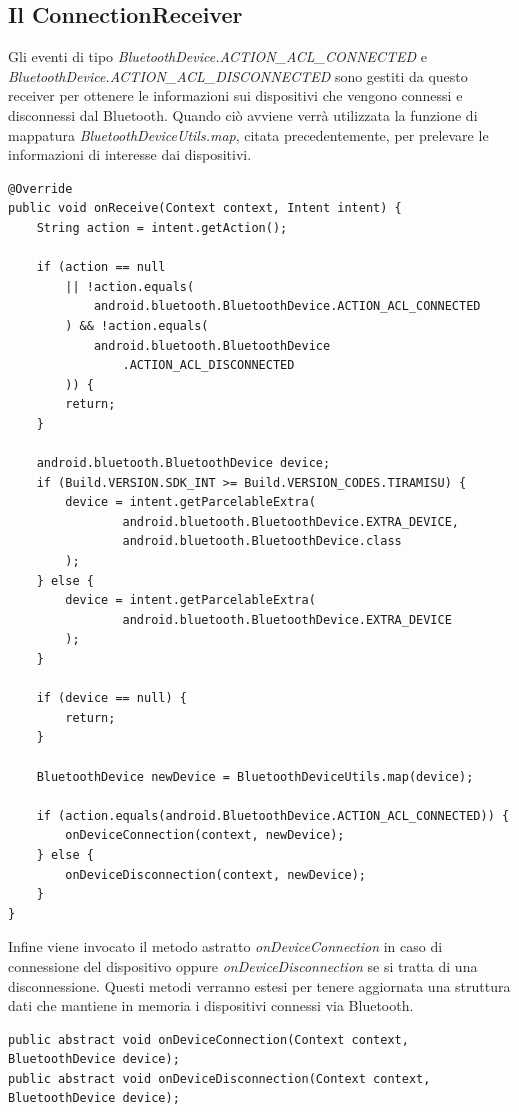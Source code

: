 \subsection{Il ConnectionReceiver}
Gli eventi di tipo \textit{BluetoothDevice.ACTION\_ACL\_CONNECTED} e \textit{BluetoothDevice.ACTION\_ACL\_DISCONNECTED} sono gestiti da questo receiver per ottenere le informazioni sui dispositivi che vengono connessi e disconnessi dal Bluetooth. Quando ciò avviene verrà utilizzata la funzione di mappatura \textit{BluetoothDeviceUtils.map}, citata precedentemente, per prelevare le informazioni di interesse dai dispositivi.
\begin{verbatim}
@Override
public void onReceive(Context context, Intent intent) {
    String action = intent.getAction();

    if (action == null 
        || !action.equals(
            android.bluetooth.BluetoothDevice.ACTION_ACL_CONNECTED
        ) && !action.equals(
            android.bluetooth.BluetoothDevice
                .ACTION_ACL_DISCONNECTED
        )) {
        return;
    }

    android.bluetooth.BluetoothDevice device;
    if (Build.VERSION.SDK_INT >= Build.VERSION_CODES.TIRAMISU) {
        device = intent.getParcelableExtra(
                android.bluetooth.BluetoothDevice.EXTRA_DEVICE,
                android.bluetooth.BluetoothDevice.class
        );
    } else {
        device = intent.getParcelableExtra(
                android.bluetooth.BluetoothDevice.EXTRA_DEVICE
        );
    }

    if (device == null) {
        return;
    }

    BluetoothDevice newDevice = BluetoothDeviceUtils.map(device);

    if (action.equals(android.BluetoothDevice.ACTION_ACL_CONNECTED)) {
        onDeviceConnection(context, newDevice);
    } else {
        onDeviceDisconnection(context, newDevice);
    }
}
\end{verbatim}

Infine viene invocato il metodo astratto \textit{onDeviceConnection} in caso di connessione del dispositivo oppure \textit{onDeviceDisconnection} se si tratta di una disconnessione. Questi metodi verranno estesi per tenere aggiornata una struttura dati che mantiene in memoria i dispositivi connessi via Bluetooth.
\begin{verbatim}
public abstract void onDeviceConnection(Context context, BluetoothDevice device);
public abstract void onDeviceDisconnection(Context context, BluetoothDevice device);
\end{verbatim}

